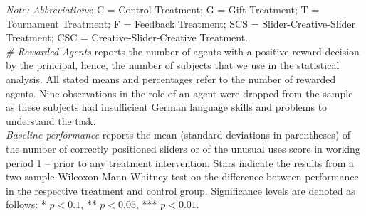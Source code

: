 \begin{landscape}
\begin{table}
\begin{center}
\begin{tabular}[t]{|l|c|c|c|c|c|c|c|c||c|c|c|c||c|}
\hline
\end{tabular}
\begin{minipage}{\linewidth}
\footnotesize
\vspace{5mm}
{\it Note:}\textit{ Abbreviations}: C  =  Control Treatment; G  =  Gift Treatment; T  =  Tournament Treatment; F  =  Feedback Treatment; SCS =  Slider-Creative-Slider Treatment; CSC  =  Creative-Slider-Creative Treatment.\\ 
 \textit{\# Rewarded Agents} reports the number of agents with a positive reward decision by the principal, hence, the number of subjects that we use in the statistical analysis. All stated means and percentages refer to the number of rewarded agents. Nine observations in the role of an agent were dropped from the sample as these subjects had insufficient German language skills and problems to understand the task.\\ 
\hspace{3mm}\textit{Baseline performance} reports the mean (standard deviations in parentheses) of the number of correctly positioned sliders or of the unusual uses score in working period 1 -- prior to any treatment intervention. Stars indicate the results from a two-sample Wilcoxon-Mann-Whitney test on the difference between performance in the respective treatment and control group. Significance levels are denoted as follows: * $p < 0.1$, ** $p < 0.05$, *** $p < 0.01$.
\end{minipage}
\label{tab:Summary_Statistics}
\end{center}
\end{table}
\end{landscape}
